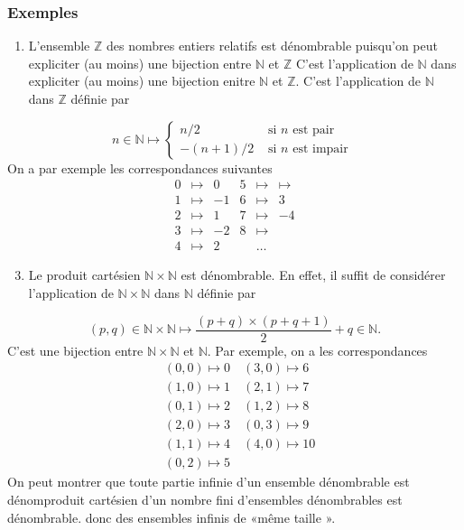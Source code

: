 \documentclass[10pt]{book}
\begin{document}
\subsubsection*{Exemples}
\begin{enumerate}
  \item L'ensemble $\mathbb{Z}$ des nombres entiers relatifs est dénombrable puisqu'on peut\\
expliciter (au moins) une bijection entre $\mathbb{N}$ et $\mathbb{Z}$ C'est l'application de $\mathbb{N}$ dans expliciter (au moins) une bijection enitre $\mathbb{N}$ et $\mathbb{Z}$. C'est l'application de $\mathbb{N}$ dans
$\mathbb{Z}$ définie par
\end{enumerate}
$$
n \in \mathbb{N} \longmapsto \begin{cases}n / 2 & \text { si } n \text { est pair } \\ -(n+1) / 2 & \text { si } n \text { est impair }\end{cases}
$$
On a par exemple les correspondances suivantes
$$
\begin{array}{rlrlrr}
0 & \longmapsto & 0 & 5 & \longmapsto & \longmapsto \\
1 & \longmapsto & -1 & 6 & \longmapsto & 3 \\
2 & \longmapsto & 1 & 7 & \longmapsto & -4 \\
3 & \longmapsto & -2 & 8 & \longmapsto & \\
4 & \longmapsto & 2 & & \ldots &
\end{array}
$$

\begin{enumerate}
  \setcounter{enumi}{2}
  \item Le produit cartésien $\mathbb{N} \times \mathbb{N}$ est dénombrable. En effet, il suffit de considérer l'application de $\mathbb{N} \times \mathbb{N}$ dans $\mathbb{N}$ définie par
\end{enumerate}
$$
(p, q) \in \mathbb{N} \times \mathbb{N} \longmapsto \frac{(p+q) \times(p+q+1)}{2}+q \in \mathbb{N} .
$$
C'est une bijection entre $\mathbb{N} \times \mathbb{N}$ et $\mathbb{N}$. Par exemple, on a les correspondances
$$
\begin{aligned}
& (0,0) \longmapsto 0 \quad(3,0) \longmapsto 6 \\
& (1,0) \longmapsto 1 \quad(2,1) \longmapsto 7 \\
& (0,1) \longmapsto 2 \quad(1,2) \longmapsto 8 \\
& (2,0) \longmapsto 3 \quad(0,3) \longmapsto 9 \\
& (1,1) \longmapsto 4 \quad(4,0) \longmapsto 10 \\
& (0,2) \longmapsto 5
\end{aligned}
$$
On peut montrer que toute partie infinie d'un ensemble dénombrable est dénomproduit cartésien d'un nombre fini d'ensembles dénombrables est dénombrable. donc des ensembles infinis de «même taille ».
\end{document}
